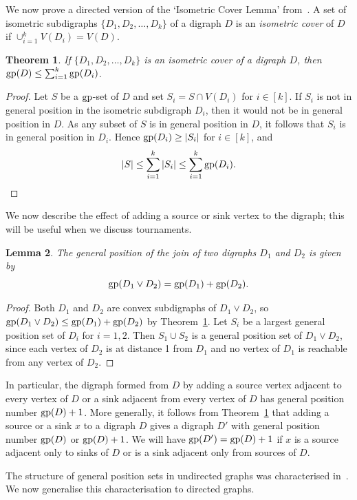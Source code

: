\documentclass[a4paper,12pt]{article}
\newtheorem{theorem}{Theorem}[section]
\newtheorem{lemma}[theorem]{Lemma}
\theoremstyle{definition}
\newcommand{\gp}{{\rm gp}}
\begin{document}
	We now prove a directed version of the `Isometric Cover Lemma' from~\cite{ref9}. A set of isometric subdigraphs $\{ D_1,D_2,\ldots,D_k\}$ of a digraph $D$ is an \emph{isometric cover} of $D$ if $\cup_{i=1}^{k} V(D_i) = V(D)$.
	
	\begin{theorem}\label{thm:isometric cover}
		If $\{ D_1,D_2,\dots,D_k\}$ is an isometric cover of a digraph $D$, then $\gp(D) \leq \sum_{i=1}^{k} \gp (D_i)$.
	\end{theorem}
	\begin{proof}
		Let $S$ be a $\gp$-set of $D$ and set $S_i= S \cap V(D_i)$ for 
		$i\in [k]$. If $S_i$ is not in general position in the isometric subdigraph $D_i$, then it would not be in general position in $D$. As any subset of $S$ is in general position in $D$, it follows that $S_i$ is in general position in $D_i$. Hence $\gp (D_i) \geq |S_i|$ for $i \in [k]$, and \[ |S| \leq \sum _{i = 1}^k |S_i| \leq \sum _{i = 1}^k\gp (D_i).\]     
	\end{proof}
	
	We now describe the effect of adding a source or sink vertex to the digraph; this will be useful when we discuss tournaments.
	
	\begin{lemma}\label{lem:addingsinks}
		The general position of the join of two digraphs $D_1$ and $D_2$ is given by \[ \gp (D_1 \vee D_2) = \gp (D_1)+\gp (D_2).\] 
	\end{lemma}
	\begin{proof}
		Both $D_1$ and $D_2$ are convex subdigraphs of $D_1 \vee D_2$, so $\gp (D_1 \vee D_2) \leq \gp (D_1)+\gp (D_2)$ by Theorem~\ref{thm:isometric cover}. Let $S_i$ be a largest general position set of $D_i$ for $i = 1,2$. Then $S_1 \cup S_2$ is a general position set of $D_1 \vee D_2$, since each vertex of $D_2$ is at distance 1 from $D_1$ and no vertex of $D_1$ is reachable from any vertex of $D_2$.
	\end{proof}
	In particular, the digraph formed from $D$ by adding a source vertex adjacent to every vertex of $D$ or a sink adjacent from every vertex of $D$ has general position number $\gp (D)+1$. More generally, it follows from Theorem~\ref{thm:isometric cover} that adding a source or a sink $x$ to a digraph $D$ gives a digraph $D'$ with general position number $\gp (D)$ or $\gp (D)+1$. We will have $\gp (D')=\gp(D)+1$ if $x$ is a source adjacent only to sinks of $D$ or is a sink adjacent only from sources of $D$.
	
	The structure of general position sets in undirected graphs was characterised in~\cite{AnaChaChaKlaTho}. We now generalise this characterisation to directed graphs.
	
\end{document}
